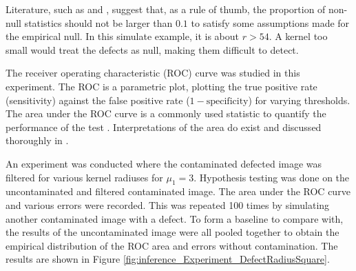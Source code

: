 \documentclass[twocolumn]{article}
\begin{document}
Literature, such as \cite{efron2004large} and \cite{schwartzman2008empirical}, suggest that, as a rule of thumb, the proportion of non-null statistics should not be larger than $0.1$ to satisfy some assumptions made for the empirical null. In this simulate example, it is about $r>54$. A kernel too small would treat the defects as null, making them difficult to detect.

The receiver operating characteristic (ROC) curve \citep{green1966signal, metz1978basic, hanley1982meaning, friedman2001elements, cook2007use} was studied in this experiment. The ROC is a parametric plot, plotting the true positive rate (sensitivity) against the false positive rate ($1-\text{specificity}$) for varying thresholds. The area under the ROC curve is a commonly used statistic to quantify the performance of the test \citep{friedman2001elements}. Interpretations of the area do exist \citep{metz1978basic,hanley1982meaning} and discussed thoroughly in \cite{cook2007use}.

An experiment was conducted where the contaminated defected image was filtered for various kernel radiuses for $\mu_1=3$. Hypothesis testing was done on the uncontaminated and filtered contaminated image. The area under the ROC curve and various errors were recorded. This was repeated 100 times by simulating another contaminated image with a defect. To form a baseline to compare with, the results of the uncontaminated image were all pooled together to obtain the empirical distribution of the ROC area and errors without contamination. The results are shown in Figure \ref{fig:inference_Experiment_DefectRadiusSquare}.
\end{document}
